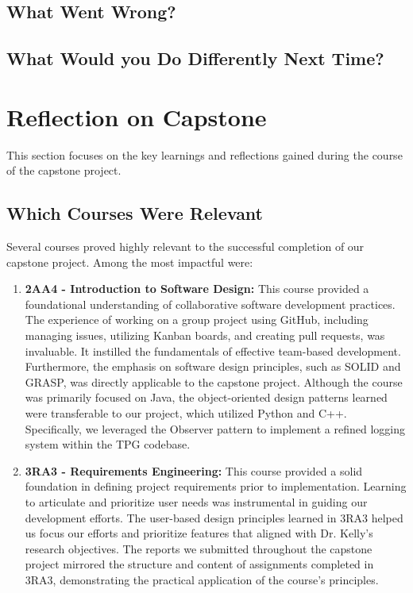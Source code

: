 \documentclass{article}
\begin{document}

\subsection{What Went Wrong?}


\subsection{What Would you Do Differently Next Time?}


\section{Reflection on Capstone}

This section focuses on the key learnings and reflections gained during the course of the capstone project.

\subsection{Which Courses Were Relevant}

Several courses proved highly relevant to the successful completion of our capstone project. Among the most impactful were:

\begin{enumerate}
    \item \textbf{2AA4 - Introduction to Software Design:} This course provided a foundational understanding of collaborative software development practices. The experience of working on a group project using GitHub, including managing issues, utilizing Kanban boards, and creating pull requests, was invaluable. It instilled the fundamentals of effective team-based development. Furthermore, the emphasis on software design principles, such as SOLID and GRASP, was directly applicable to the capstone project. Although the course was primarily focused on Java, the object-oriented design patterns learned were transferable to our project, which utilized Python and C++. Specifically, we leveraged the Observer pattern to implement a refined logging system within the TPG codebase.

    \item \textbf{3RA3 - Requirements Engineering:} This course provided a solid foundation in defining project requirements prior to implementation. Learning to articulate and prioritize user needs was instrumental in guiding our development efforts. The user-based design principles learned in 3RA3 helped us focus our efforts and prioritize features that aligned with Dr. Kelly's research objectives. The reports we submitted throughout the capstone project mirrored the structure and content of assignments completed in 3RA3, demonstrating the practical application of the course's principles.
\end{enumerate}
\end{document}
